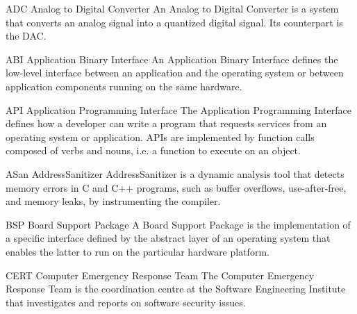 \usepackage[nopostdot, numberedsection, style=super, section, toc, acronyms, nogroupskip]{glossaries}
\usepackage{xparse}

\setlength{\glsdescwidth}{0.8\textwidth}
\renewcommand{\glsnamefont}[1]{\textbf{#1}}

 {
}

\makeglossaries

%
  {ADC}%
  {Analog to Digital Converter}%
  {An Analog to Digital Converter is a system that converts an analog signal
   into a quantized digital signal. Its counterpart is the \gls{DAC}.}%

%
  {ABI}%
  {Application Binary Interface}%
  {An Application Binary Interface defines the low-level interface between
   an application and the operating system or between application components
   running on the same hardware.}%

%
  {API}%
  {Application Programming Interface}%
  {The Application Programming Interface defines how a developer can write
   a program that requests services from an operating system or application.
   \glspl{API} are implemented by function calls composed of verbs and nouns,
   i.e. a function to execute on an object.}%

%
  {ASan}%
  {AddressSanitizer}%
  {AddressSanitizer is a dynamic analysis tool that detects memory errors in %
   C and C++ programs, such as buffer overflows, use-after-free, and memory %
   leaks, by instrumenting the compiler.}%

%
  {BSP}%
  {Board Support Package}%
  {A Board Support Package is the implementation of a specific interface defined
   by the abstract layer of an operating system that enables the latter to run
   on the particular hardware platform.}%

%
  {CERT}%
  {Computer Emergency Response Team}%
  {The Computer Emergency Response Team is the coordination centre at the %
   Software Engineering Institute that investigates and reports on software %
   security issues.}%

